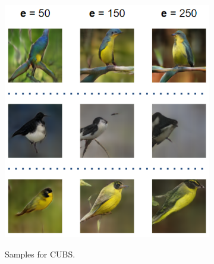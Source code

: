 \documentclass[letterpaper]{article} %
\begin{document}
\begin{figure}[h!]
\centering
\begin{subfigure}{0.22\textwidth}
\begin{center}
\begin{minipage}[t]{0.95\linewidth}
\begin{centering}
{\includegraphics[width=\linewidth]{evolution_birds.png}}
\caption{Samples for CUBS.}
\label{fig:evolution_birds}
\end{centering}
\end{minipage}
\end{center}
\end{subfigure}
\begin{subfigure}{0.22\textwidth}
\begin{center}
\begin{minipage}[t]{0.95\linewidth}
\begin{centering}

\end{centering}
\end{minipage}
\end{center}
\end{subfigure}
\end{figure}
\end{document}
